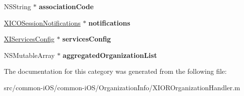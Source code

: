 \begin{DoxyCompactItemize}
N\+S\+String $\ast$ {\bfseries association\+Code}
\item 
\hypertarget{category_x_i_o_r_organization_handler_07_08_a6e0e8774fa94ec62749cb92087b031bc}{}\label{category_x_i_o_r_organization_handler_07_08_a6e0e8774fa94ec62749cb92087b031bc} 
\hyperlink{interface_x_i_c_o_session_notifications}{X\+I\+C\+O\+Session\+Notifications} $\ast$ {\bfseries notifications}
\item 
\hypertarget{category_x_i_o_r_organization_handler_07_08_a1468ff03ff124d5a29272b9e1e05b0fa}{}\label{category_x_i_o_r_organization_handler_07_08_a1468ff03ff124d5a29272b9e1e05b0fa} 
\hyperlink{interface_x_i_services_config}{X\+I\+Services\+Config} $\ast$ {\bfseries services\+Config}
\item 
\hypertarget{category_x_i_o_r_organization_handler_07_08_a86c48c04a0d0bef34bf51bb662432832}{}\label{category_x_i_o_r_organization_handler_07_08_a86c48c04a0d0bef34bf51bb662432832} 
N\+S\+Mutable\+Array $\ast$ {\bfseries aggregated\+Organization\+List}
\end{DoxyCompactItemize}


The documentation for this category was generated from the following file\+:\begin{DoxyCompactItemize}
\item 
src/common-\/i\+O\+S/common-\/i\+O\+S/\+Organization\+Info/X\+I\+O\+R\+Organization\+Handler.\+m\end{DoxyCompactItemize}
